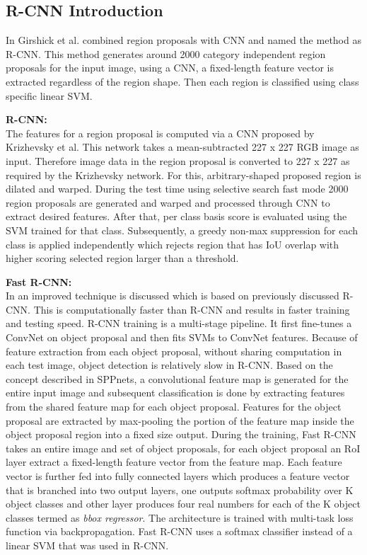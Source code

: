 \subsection{R-CNN Introduction}
In \cite{girshick2014rich} Girshick et al. combined region proposals with CNN and named the method as R-CNN. This method generates around 2000 category independent region proposals for the input image, using a CNN, a fixed-length feature vector is extracted regardless of the region shape. Then each region is classified using class specific linear SVM. 

\newpara \textbf{R-CNN:} \\
The features for a region proposal \cite{girshick2014rich, girshick2015fast, ren2015faster} is computed via a CNN proposed by Krizhevsky et al. This network takes a mean-subtracted 227 x 227 RGB image as input. Therefore image data in the region proposal is converted to 227 x 227 as required by the Krizhevsky network. For this, arbitrary-shaped  proposed region is dilated and warped. During the test time using selective search fast mode 2000 region proposals are generated and warped and processed through CNN to extract desired features. After that, per class basis score is evaluated using the SVM trained for that class. Subsequently, a greedy non-max suppression for each class is applied independently which rejects region that has IoU overlap with higher scoring selected region larger than a threshold.

\newpara \textbf{Fast R-CNN:} \\
In \cite{girshick2015fast} an improved technique is discussed which is based on previously discussed R-CNN. This is computationally faster than R-CNN and results in faster training and testing speed. R-CNN training is a multi-stage pipeline. It first fine-tunes a ConvNet on object proposal and then fits SVMs to ConvNet features. Because of feature extraction from each object proposal, without sharing computation in each test image, object detection is relatively slow in R-CNN. Based on the concept described in SPPnets, a convolutional feature map is generated for the entire input image and subsequent classification is done by extracting features from the shared feature map for each object proposal. Features for the object proposal are extracted by max-pooling the portion of the feature map inside the  object proposal region into a fixed size output. During the training, Fast R-CNN takes an entire image and set of object proposals, for each object proposal an RoI layer extract a fixed-length feature vector from the feature map. Each feature vector is further fed into fully connected layers which produces a feature vector that is branched into two output layers, one outputs softmax probability over K object classes and other layer produces four real numbers for each of the K object classes termed as \textit{bbox regressor}. The architecture is trained with multi-task loss function via backpropagation. Fast R-CNN uses a softmax classifier instead of a linear SVM that was used in R-CNN.

